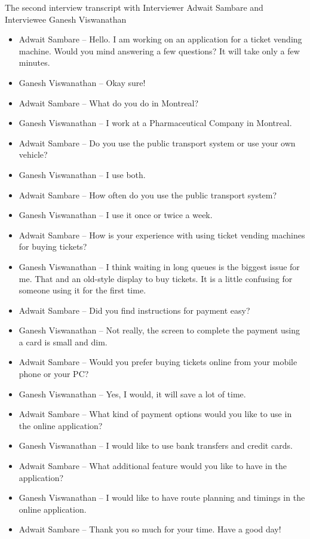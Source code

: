The second interview transcript with Interviewer Adwait Sambare and Interviewee Ganesh Viswanathan

\begin{itemize}
    \item[] Adwait Sambare – Hello. I am working on an application for a ticket vending machine. Would you mind answering a few questions? It will take only a few minutes.
    \item[] Ganesh Viswanathan – Okay sure!
    \item[] Adwait Sambare – What do you do in Montreal?
    \item[] Ganesh Viswanathan – I work at a Pharmaceutical Company in Montreal. 
    \item[] Adwait Sambare – Do you use the public transport system or use your own vehicle?
    \item[] Ganesh Viswanathan – I use both.
    \item[] Adwait Sambare – How often do you use the public transport system?
    \item[] Ganesh Viswanathan – I use it once or twice a week.
    \item[] Adwait Sambare – How is your experience with using ticket vending machines for buying tickets? 
    \item[] Ganesh Viswanathan – I think waiting in long queues is the biggest issue for me. That and an old-style display to buy tickets. It is a little confusing for someone using it for the first time.
    \item[] Adwait Sambare – Did you find instructions for payment easy?
    \item[] Ganesh Viswanathan – Not really, the screen to complete the payment using a card is small and dim.
    \item[] Adwait Sambare – Would you prefer buying tickets online from your mobile phone or your PC?
    \item[] Ganesh Viswanathan – Yes, I would, it will save a lot of time.
    \item[] Adwait Sambare – What kind of payment options would you like to use in the online application?
    \item[] Ganesh Viswanathan – I would like to use bank transfers and credit cards. 
    \item[] Adwait Sambare – What additional feature would you like to have in the application?
    \item[] Ganesh Viswanathan – I would like to have route planning and timings in the online application. 
    \item[] Adwait Sambare – Thank you so much for your time. Have a good day!
\end{itemize}
\pagebreak
